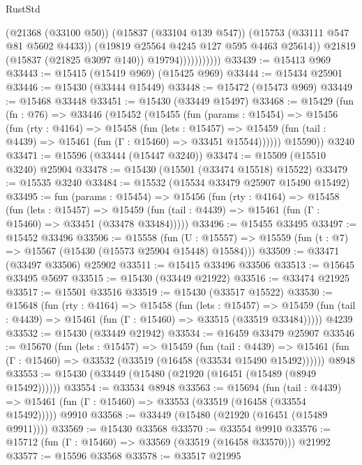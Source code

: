 \begin{lexlean}{RustStd}
\begin{coremodule}
{\begin{coremodule}
{{{{{{{{{{{{{{{{{{{{{{{{{{{{{{{{{{{{{{{{{{{{{{{{{{{{{{{{{{{{                            (@21368 (@33100 @50))
                            (@15837 (@33104 @139 @547))
                            (@15753 (@33111 @547 @81 @5602 @4433))
                            (@19819 @25564 @4245 @127 @595 @4463 @25614))
                          @21819
                          (@15837 (@21825 @3097 @140))
                          @19794)))))))))))
@33439 := @15413 @969
@33443 := @15415 (@15419 @969) (@15425 @969)
@33444 := @15434 @25901
@33446 := @15430 (@33444 @15449)
@33448 := @15472 (@15473 @969)
@33449 := @15468 @33448
@33451 := @15430 (@33449 @15497)
@33468 := @15429
    (fun (fn : @76) =>
    @33446
      (@15452
        (@15455
          (fun (params : @15454) =>
          @15456
            (fun (rty : @4164) =>
            @15458
              (fun (lets : @15457) =>
              @15459 (fun (tail : @4439) => @15461 (fun (Γ : @15460) => @33451 @15544))))))
        @15590))
    @3240
@33471 := @15596 (@33444 (@15447 @3240))
@33474 := @15509 (@15510 @3240) @25904
@33478 := @15430 (@15501 (@33474 @15518) @15522)
@33479 := @15535 @3240
@33484 := @15532 (@15534 @33479 @25907 @15490 @15492)
@33495 := fun (params : @15454) =>
  @15456
    (fun (rty : @4164) =>
    @15458
      (fun (lets : @15457) =>
      @15459 (fun (tail : @4439) => @15461 (fun (Γ : @15460) => @33451 (@33478 @33484)))))
@33496 := @15455 @33495
@33497 := @15452 @33496
@33506 := @15558
    (fun (U : @15557) => @15559 (fun (t : @7) => @15567 (@15430 (@15573 @25904 @15448) @15584)))
@33509 := @33471 (@33497 @33506) @25902
@33511 := @15415 @33496 @33506
@33513 := @15645 @33495 @5697
@33515 := @15430 (@33449 @21922)
@33516 := @33474 @21925
@33517 := @15501 @33516
@33519 := @15430 (@33517 @15522)
@33530 := @15648
    (fun (rty : @4164) =>
    @15458
      (fun (lets : @15457) =>
      @15459 (fun (tail : @4439) => @15461 (fun (Γ : @15460) => @33515 (@33519 @33484)))))
    @4239
@33532 := @15430 (@33449 @21942)
@33534 := @16459 @33479 @25907
@33546 := @15670
    (fun (lets : @15457) =>
    @15459
      (fun (tail : @4439) =>
      @15461 (fun (Γ : @15460) => @33532 (@33519 (@16458 (@33534 @15490 @15492))))))
    @8948
@33553 := @15430 (@33449 (@15480 (@21920 (@16451 (@15489 (@8949 @15492))))))
@33554 := @33534 @8948
@33563 := @15694
    (fun (tail : @4439) => @15461 (fun (Γ : @15460) => @33553 (@33519 (@16458 (@33554 @15492)))))
    @9910
@33568 := @33449 (@15480 (@21920 (@16451 (@15489 @9911))))
@33569 := @15430 @33568
@33570 := @33554 @9910
@33576 := @15712 (fun (Γ : @15460) => @33569 (@33519 (@16458 @33570))) @21992
@33577 := @15596 @33568
@33578 := @33517 @21995
}}}}}}}}}}}}}}}}}}}}}}}}}}}}}}}}}}}}}}}}}}}}}}}}}}}}}}}}}}}}
\end{coremodule}}
\end{coremodule}
\end{lexlean}

